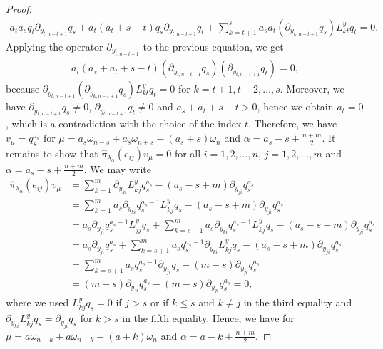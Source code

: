 \begin{proof}
\begin{align*}
  a_ta_s q_t \partial_{y_{t,n-t+1}} q_s + a_t(a_t+s-t)q_s \partial_{y_{t,n-t+1}} q_t + \sum_{k=t+1}^s a_sa_t (\partial_{y_{k,n-t+1}}q_s) L^y_{kt}q_t = 0.
\end{align*}
Applying the operator $\partial_{y_{t,n-t+1}}$ to the previous equation, we get
\begin{align*}
  a_t(a_s+a_t+s-t) (\partial_{y_{t,n-t+1}} q_s)(\partial_{y_{t,n-t+1}} q_t) = 0,
\end{align*}
because $\partial_{y_{t,n-t+1}} (\partial_{y_{k,n-t+1}}q_s) L^y_{kt}q_t=0$ for $k=t+1,t+2,\dots,s$. Moreover, we have $\partial_{y_{t,n-t+1}} q_s \neq 0$, $\partial_{y_{t,n-t+1}} q_t \neq 0$ and $a_s +a_t +s-t >0$, hence we obtain $a_t = 0$, which is a contradiction with the choice of the index $t$. Therefore, we have $v_\mu = q_s^{a_s}$ for $\mu= a_s \omega_{n-s} +a_s \omega_{n+s} - (a_s+s)\omega_n$ and $\alpha=a_s -s + \frac{n + m}{2}$. It remains to show that $\hat{\pi}_{\lambda_\alpha}\!(e_{ij})v_\mu=0$ for all $i=1,2,\dots,n$, $j=1,2,\dots,m$ and $\alpha=a_s-s+\frac{n+m}{2}$.
We may write
\begin{align*}
  \hat{\pi}_{\lambda_\alpha}\!(e_{ij})v_\mu &= \sum_{k=1}^m  \partial_{y_{ki}} L^y_{kj}q_s^{a_s} - (a_s-s+m) \partial_{y_{ji}}q_s^{a_s} \\
  &= \sum_{k=1}^m  a_s \partial_{y_{ki}} q_s^{a_s-1}L^y_{kj}q_s - (a_s-s+m) \partial_{y_{ji}}q_s^{a_s} \\
  & =a_s \partial_{y_{ji}} q_s^{a_s-1}L^y_{jj}q_s + \sum_{k=s+1}^m  a_s \partial_{y_{ki}} q_s^{a_s-1}L^y_{kj}q_s - (a_s-s+m) \partial_{y_{ji}}q_s^{a_s} \\ &= a_s \partial_{y_{ji}} q_s^{a_s} +  \sum_{k=s+1}^m  a_s  q_s^{a_s-1} \partial_{y_{ki}}L^y_{kj}q_s - (a_s-s+m) \partial_{y_{ji}}q_s^{a_s} \\
  &=  \sum_{k=s+1}^m  a_s  q_s^{a_s-1} \partial_{y_{ji}}q_s -(m-s)\partial_{y_{ji}}q_s^{a_s} \\
  &=(m-s)\partial_{y_{ji}}q_s^{a_s}-(m-s)\partial_{y_{ji}}q_s^{a_s}=0,
\end{align*}
where we used $L^y_{kj}q_s=0$ if $j>s$ or if $k \leq s$ and $k\neq j$ in the third equality and $\partial_{y_{ki}}L^y_{kj}q_s=\partial_{y_{ji}} q_s$ for $k > s$ in the fifth equality. Hence, we have  for $\mu=a \omega_{n-k} + a\omega_{n+k}-(a+k)\omega_n$ and $\alpha = a-k + \frac{n+m}{2}$.
\end{proof}


